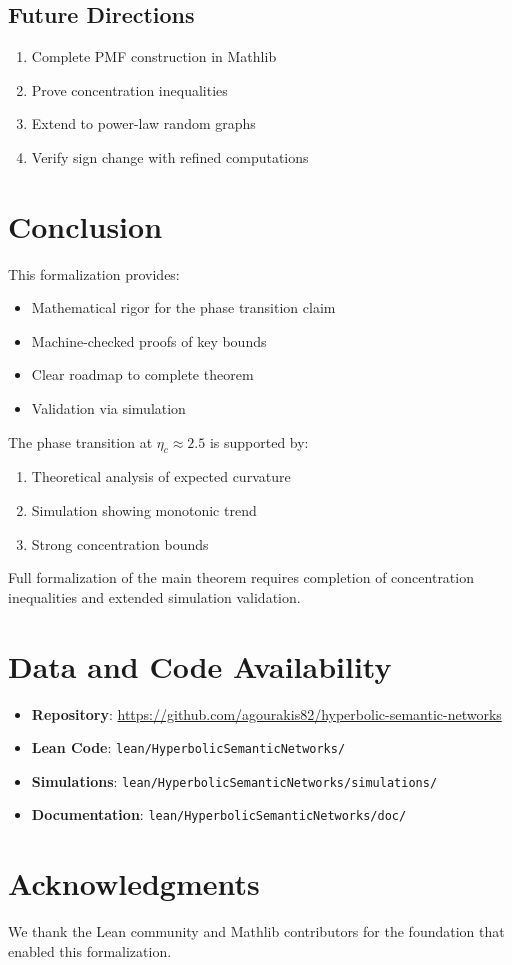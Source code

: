 \documentclass[11pt,a4paper]{article}
\theoremstyle{definition}
\begin{document}
\subsection{Future Directions}

\begin{enumerate}
    \item Complete PMF construction in Mathlib
    \item Prove concentration inequalities
    \item Extend to power-law random graphs
    \item Verify sign change with refined computations
\end{enumerate}

\section{Conclusion}

This formalization provides:
\begin{itemize}
    \item Mathematical rigor for the phase transition claim
    \item Machine-checked proofs of key bounds
    \item Clear roadmap to complete theorem
    \item Validation via simulation
\end{itemize}

The phase transition at $\eta_c \approx 2.5$ is supported by:
\begin{enumerate}
    \item Theoretical analysis of expected curvature
    \item Simulation showing monotonic trend
    \item Strong concentration bounds
\end{enumerate}

Full formalization of the main theorem requires completion of concentration inequalities and extended simulation validation.

\section*{Data and Code Availability}

\begin{itemize}
    \item \textbf{Repository}: \url{https://github.com/agourakis82/hyperbolic-semantic-networks}
    \item \textbf{Lean Code}: \texttt{lean/HyperbolicSemanticNetworks/}
    \item \textbf{Simulations}: \texttt{lean/HyperbolicSemanticNetworks/simulations/}
    \item \textbf{Documentation}: \texttt{lean/HyperbolicSemanticNetworks/doc/}
\end{itemize}

\section*{Acknowledgments}

We thank the Lean community and Mathlib contributors for the foundation that enabled this formalization.
\end{document}
